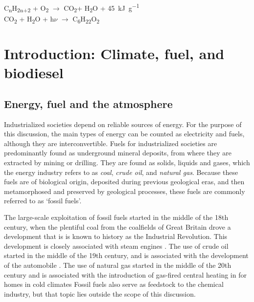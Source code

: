 \begin{savequote}[\quotewidth]
C\textsubscript{n}H\textsubscript{2n+2} + O\textsubscript{2} $\rightarrow$ CO\textsubscript{2}+ H\textsubscript{2}O + \SI{45}{\kilo\joule\per\gram}\\
CO\textsubscript{2} + H\textsubscript{2}O + h$\nu$ $\rightarrow$ C\textsubscript{6}H\textsubscript{22}O\textsubscript{2} 
\end{savequote}

\chapter{Introduction: Climate, fuel, and biodiesel} %

\label{Chapter1} %


\section{Energy, fuel and the atmosphere}

Industrialized societies depend on reliable sources of energy. For the purpose
of this discussion, the main types of energy can be counted as electricity and
fuels, although they are interconvertible. Fuels for industrialized societies
are predominantly found as underground mineral deposits, from where they are
extracted by mining or drilling. They are found as solids, liquids and gases,
which the energy industry refers to as \textit{coal}, \textit{crude oil}, and
\textit{natural gas}. Because these fuels are of biological origin, deposited
during previous geological eras, and then metamorphosed and preserved by
geological processes, these fuels are commonly referred to as `fossil fuels'.

The large-scale exploitation of fossil fuels started in the middle of the 18th
century, when the plentiful coal from the coalfields of Great Britain drove a
development that is is known to history as the Industrial Revolution. This
development is closely associated with steam engines \autocite{Rosen2012}. The
use of crude oil started in the middle of the 19th century, and is associated
with the development of the automobile \autocite[p. 42]{Watts2005}. The use of
natural gas started in the middle of the 20th century and is associated with the
introduction of gas-fired central heating in for homes in cold climates
\autocite{Hanmer2017} Fossil fuels also serve as feedstock to the chemical
industry, but that topic lies outside the scope of this discussion.

